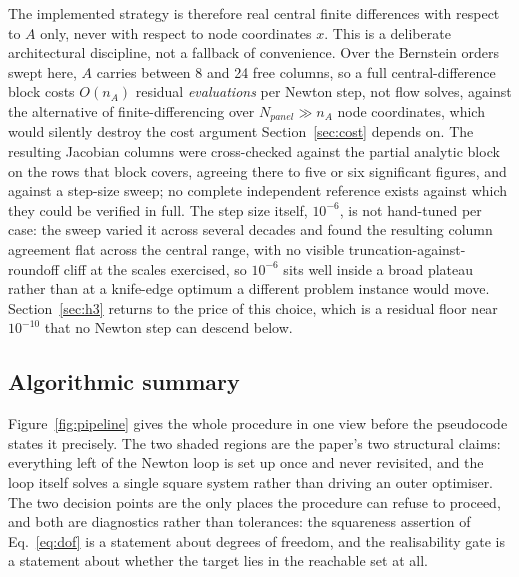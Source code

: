 The implemented strategy is therefore real central finite differences with
respect to $A$ only, never with respect to node coordinates $x$. This is a
deliberate architectural discipline, not a fallback of convenience. Over the
Bernstein orders swept here, $A$ carries between 8 and 24 free columns, so a
full central-difference block costs $O(n_A)$ residual \emph{evaluations} per
Newton step, not flow solves, against the alternative of finite-differencing
over $N_{panel}\gg n_A$ node coordinates, which would silently destroy the
cost argument Section~\ref{sec:cost} depends on. The resulting Jacobian
columns were cross-checked against the partial analytic block on the rows that
block covers, agreeing there to five or six significant figures, and against a
step-size sweep; no complete independent reference exists against which they
could be verified in full. The step size itself, $10^{-6}$, is not hand-tuned
per case: the sweep varied it across several decades and found the resulting
column agreement flat across the central range, with no visible
truncation-against-roundoff cliff at the scales exercised, so $10^{-6}$ sits
well inside a broad plateau rather than at a knife-edge optimum a different
problem instance would move. Section~\ref{sec:h3} returns to the price of this
choice, which is a residual floor near $10^{-10}$ that no Newton step can
descend below.

\subsection{Algorithmic summary}
\label{sec:algorithms}

Figure~\ref{fig:pipeline} gives the whole procedure in one view before the
pseudocode states it precisely. The two shaded regions are the paper's two
structural claims: everything left of the Newton loop is set up once and never
revisited, and the loop itself solves a single square system rather than
driving an outer optimiser. The two decision points are the only places the
procedure can refuse to proceed, and both are diagnostics rather than
tolerances: the squareness assertion of Eq.~\eqref{eq:dof} is a statement
about degrees of freedom, and the realisability gate is a statement about
whether the target lies in the reachable set at all.

